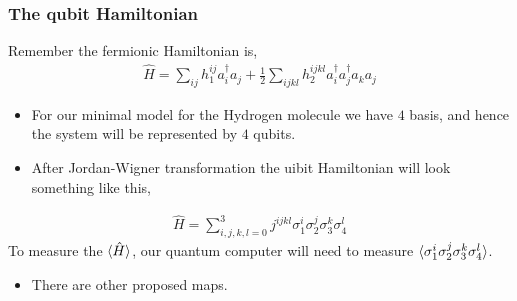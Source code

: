 \documentclass{beamer}
\renewcommand{\(}{\left(}
\renewcommand{\)}{\right)}
\renewcommand{\[}{\left[}
\renewcommand{\]}{\right]}
\begin{document}


\begin{frame}
    \frametitle{The qubit Hamiltonian}

    Remember the fermionic Hamiltonian is, 
    \begin{align*}
        \hat{H} = \sum_{ij} h^{ij}_1 a_i^\dagger a_j + \frac{1}{2} \sum_{ijkl} h_2^{ijkl} a_i^\dagger a_j^\dagger a_k a_j 
    \end{align*} 
    \begin{itemize}
        \item For our minimal model for the Hydrogen molecule we have $4$ basis, and hence the system will be represented by $4$ qubits. 
        \item After Jordan-Wigner transformation the uibit Hamiltonian will look something like this,
    \end{itemize}
     
    \begin{align*}
        \hat{H} = \sum_{i,j,k,l = 0}^ 3 j^{ijkl} \sigma^i_1 \sigma^j_2 \sigma^k_3 \sigma^l_4 
    \end{align*}
    To measure the $\braket{\hat{H}}$, our quantum computer will need to measure $\braket{\sigma^i_1 \sigma^j_2 \sigma^k_3 \sigma^l_4}$.
    \begin{itemize}
        \item There are other proposed maps. 
    \end{itemize}
\end{frame}
\end{document}
